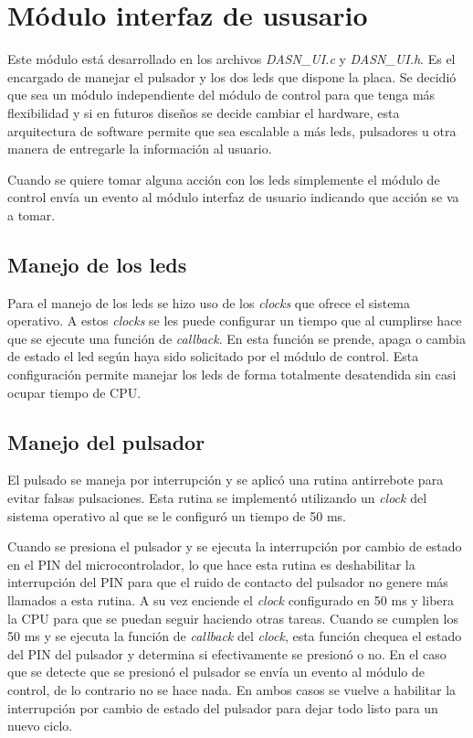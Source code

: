\section{Módulo interfaz de ususario}

Este módulo está desarrollado en los archivos \textit{DASN\_UI.c} y \textit{DASN\_UI.h}. Es el encargado de manejar el pulsador y los dos leds que dispone la placa. Se decidió que sea un módulo independiente del módulo de control para que tenga más flexibilidad y si en futuros diseños se decide cambiar el hardware, esta arquitectura de software permite que sea escalable a más leds, pulsadores u otra manera de entregarle la información al usuario. 

Cuando se quiere tomar alguna acción con los leds simplemente el módulo de control envía un evento al módulo interfaz de usuario indicando que acción se va a tomar. 

\subsection{Manejo de los leds}
Para el manejo de los leds se hizo uso de los \textit{clocks} que ofrece el sistema operativo. A estos \textit{clocks} se les puede configurar un tiempo que al cumplirse hace que se ejecute una función de \textit{callback}. En esta función se prende, apaga o cambia de estado el led según haya sido solicitado por el módulo de control. Esta configuración permite manejar los leds de forma totalmente desatendida sin casi ocupar tiempo de CPU. 

\subsection{Manejo del pulsador}
El pulsado se maneja por interrupción y se aplicó una rutina antirrebote para evitar falsas pulsaciones. Esta rutina se implementó utilizando un \textit{clock} del sistema operativo al que se le configuró un tiempo de 50 ms. 

Cuando se presiona el pulsador y se ejecuta la interrupción por cambio de estado en el PIN del microcontrolador, lo que hace esta rutina es deshabilitar la interrupción del PIN para que el ruido de contacto del pulsador no genere más llamados a esta rutina. A su vez enciende el \textit{clock} configurado en 50 ms y libera la CPU para que se puedan seguir haciendo otras tareas. Cuando se cumplen los 50 ms y se ejecuta la función de \textit{callback} del \textit{clock}, esta función chequea el estado del PIN del pulsador y determina si efectivamente se presionó o no. En el caso que se detecte que se presionó el pulsador se envía un evento al módulo de control, de lo contrario no se hace nada. En ambos casos se vuelve a habilitar la interrupción por cambio de estado del pulsador para dejar todo listo para un nuevo ciclo.

